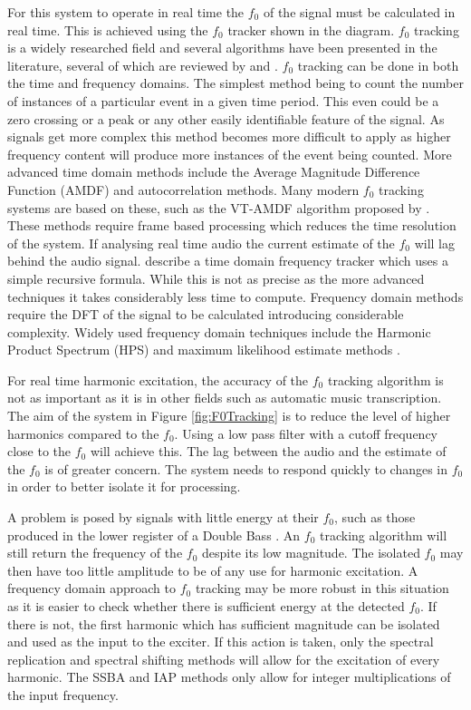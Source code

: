 		For this system to operate in real time the $f_{0}$ of the signal must be calculated in real time. This is
		achieved using the $f_{0}$ tracker shown in the diagram. $f_{0}$ tracking is a widely researched field and
		several algorithms have been presented in the literature, several of which are reviewed by
		\citet{cuadra2001efficient} and \citet{gerhard2003pitch}.  $f_{0}$ tracking can be done in both the time
		and frequency domains. The simplest method being to count the number of instances of a particular event in
		a given time period. This even could be a zero crossing or a peak or any other easily identifiable feature
		of the signal. As signals get more complex this method becomes more difficult to apply as higher frequency
		content will produce more instances of the event being counted. More advanced time domain methods include
		the Average Magnitude Difference Function (AMDF) and autocorrelation methods. Many modern $f_{0}$ tracking
		systems are based on these, such as the VT-AMDF algorithm proposed by \citet{prukkanon2009vt-amdf}.  These
		methods require frame based processing which reduces the time resolution of the system. If analysing real
		time audio the current estimate of the $f_{0}$ will lag behind the audio signal.  \citet{larsen2004audio}
		describe a time domain frequency tracker which uses a simple recursive formula. While this is not as
		precise as the more advanced techniques it takes considerably less time to compute. Frequency domain
		methods require the DFT of the signal to be calculated introducing considerable complexity. Widely used
		frequency domain techniques include the Harmonic Product Spectrum (HPS) and maximum likelihood
		estimate methods \citep{noll1969pitch}.

		For real time harmonic excitation, the accuracy of the $f_{0}$ tracking algorithm is not as important as it
		is in other fields such as automatic music transcription. The aim of the system in Figure
		\ref{fig:F0Tracking} is to reduce the level of higher harmonics compared to the $f_{0}$. Using a low pass
		filter with a cutoff frequency close to the $f_{0}$ will achieve this. The lag between the audio and the
		estimate of the $f_{0}$ is of greater concern. The system needs to respond quickly to changes in $f_{0}$ in
		order to better isolate it for processing.

		A problem is posed by signals with little energy at their $f_{0}$, such as those produced in the lower
		register of a Double Bass \citep{askenfelt2010double}. An $f_{0}$ tracking algorithm will still return the
		frequency of the $f_{0}$ despite its low magnitude. The isolated $f_{0}$ may then have too little amplitude
		to be of any use for harmonic excitation. A frequency domain approach to $f_{0}$ tracking may be more
		robust in this situation as it is easier to check whether there is sufficient energy at the detected
		$f_{0}$. If there is not, the first harmonic which has sufficient magnitude can be isolated and used as the
		input to the exciter. If this action is taken, only the spectral replication and spectral shifting methods
		will allow for the excitation of every harmonic. The SSBA and IAP methods only allow for integer
		multiplications of the input frequency.

